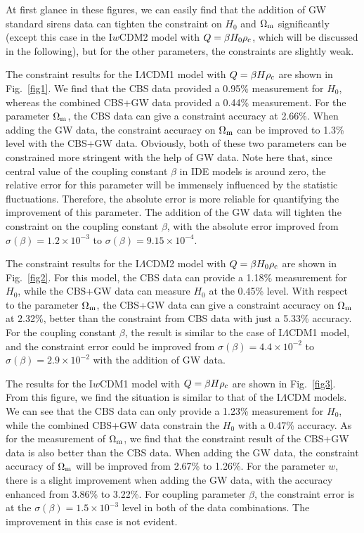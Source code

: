 \documentclass[aps,prd,nofootinbib,amsmath,amssymb,superscriptaddress,twocolumn,10pt]{revtex4}%
\begin{document}
At first glance in these figures, we can easily find that the addition of GW standard sirens data can tighten the constraint on $H_0$ and $\Omega_{\rm m}$ significantly (except this case in the I$w$CDM2 model with $Q=\beta H_{0}\rho_{\rm c}$, which will be discussed in the following), but for the other parameters, the constraints are slightly weak.


The constraint results for the I$\Lambda$CDM1 model with $Q=\beta H\rho_{\rm c}$ are shown in Fig.~\ref{fig1}. We find that the CBS data provided a 0.95\% measurement for $H_0$, whereas the combined CBS+GW data provided a 0.44\% measurement. For the parameter $\Omega_{\rm m}$, the CBS data can give a constraint accuracy at 2.66\%. When adding the GW data, the constraint accuracy on $\Omega_{\rm m}$ can be improved to 1.3\% level with the CBS+GW data. Obviously, both of these two parameters can be constrained more stringent with the help of GW data. Note here that, since central value of the coupling constant $\beta$ in IDE models is around zero, the relative error for this parameter will be immensely influenced by the statistic fluctuations. Therefore, the absolute error is more reliable for quantifying the improvement of this parameter. The addition of the GW data will tighten the constraint on the coupling constant $\beta$, with the absolute error improved from $\sigma(\beta)=1.2 \times 10^{-3}$ to $\sigma(\beta)=9.15 \times 10^{-4}$.


The constraint results for the I$\Lambda$CDM2 model with $Q=\beta H_{0}\rho_{\rm c}$ are shown in Fig.~\ref{fig2}. For this model, the CBS data can provide a 1.18\% measurement for $H_0$,  while the CBS+GW data can measure $H_0$ at the 0.45\% level. With respect to the parameter $\Omega_{\rm m}$, the CBS+GW data can give a constraint accuracy on $\Omega_{\rm m}$ at 2.32\%, better than the constraint from CBS data with just a 5.33\% accuracy. For the coupling constant $\beta$, the result is similar to the case of I$\Lambda$CDM1 model, and the constraint error could be improved  from $\sigma(\beta)=4.4 \times 10^{-2}$ to $\sigma(\beta)=2.9 \times 10^{-2}$ with the addition of GW data.

The results for the I$w$CDM1 model with $Q=\beta H\rho_{\rm c}$ are shown in Fig.~\ref{fig3}. From this figure, we find the situation is similar to that of the I$\Lambda$CDM models. We can see that the CBS data can only provide a 1.23\% measurement for $H_0$, while the combined CBS+GW data constrain the $H_0$ with a 0.47\% accuracy. As for the measurement of $\Omega_{\rm m}$, we find that the constraint result of the CBS+GW data is also better than the CBS data. When adding the GW data, the constraint accuracy of $\Omega_{\rm m}$ will be improved from 2.67\% to 1.26\%. For the parameter $w$, there is a slight improvement when adding the GW data, with the accuracy enhanced from 3.86\% to 3.22\%. For coupling parameter $\beta$, the constraint error is at the $\sigma(\beta)=1.5 \times 10^{-3}$ level in both of the data combinations. The improvement in this case is not evident.
\end{document}
